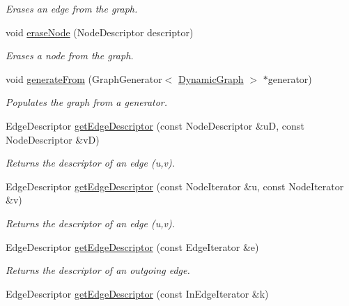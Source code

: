\begin{DoxyCompactItemize}
\begin{DoxyCompactList}\small\item\em Erases an edge from the graph. \item\end{DoxyCompactList}\item 
void \hyperlink{class_dynamic_graph_aaf6cb65860223b369ca8a07fb59806cc}{eraseNode} (NodeDescriptor descriptor)
\begin{DoxyCompactList}\small\item\em Erases a node from the graph. \item\end{DoxyCompactList}\item 
void \hyperlink{class_dynamic_graph_ae71e8643f129b0ffffe5cc8e6878fd2f}{generateFrom} (GraphGenerator$<$ \hyperlink{class_dynamic_graph}{DynamicGraph} $>$ $\ast$generator)
\begin{DoxyCompactList}\small\item\em Populates the graph from a generator. \item\end{DoxyCompactList}\item 
EdgeDescriptor \hyperlink{class_dynamic_graph_a1b007b348fca01228dedc6bf93e14e70}{getEdgeDescriptor} (const NodeDescriptor \&uD, const NodeDescriptor \&vD)
\begin{DoxyCompactList}\small\item\em Returns the descriptor of an edge (u,v). \item\end{DoxyCompactList}\item 
EdgeDescriptor \hyperlink{class_dynamic_graph_a83a9c51df95e5e3ef353b64f58781f00}{getEdgeDescriptor} (const NodeIterator \&u, const NodeIterator \&v)
\begin{DoxyCompactList}\small\item\em Returns the descriptor of an edge (u,v). \item\end{DoxyCompactList}\item 
EdgeDescriptor \hyperlink{class_dynamic_graph_afb6635b9e02a5b74797a8e9349b4e022}{getEdgeDescriptor} (const EdgeIterator \&e)
\begin{DoxyCompactList}\small\item\em Returns the descriptor of an outgoing edge. \item\end{DoxyCompactList}\item 
EdgeDescriptor \hyperlink{class_dynamic_graph_ab0eb6d1bc17887c04540e47411430751}{getEdgeDescriptor} (const InEdgeIterator \&k)

\end{DoxyCompactItemize}
